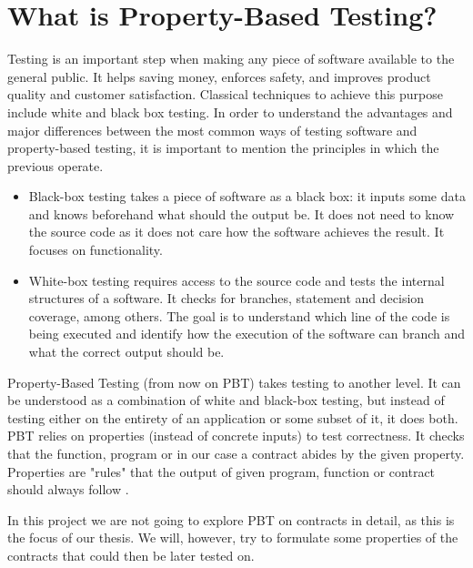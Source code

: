 \documentclass{ituthesis}
\begin{document}
\section{What is Property-Based Testing?}
Testing is an important step when making any piece of software available to the general public. It helps saving money, enforces safety, and improves product quality and customer satisfaction. %
Classical techniques to achieve this purpose include white and black box testing. %
In order to understand the advantages and major differences between the most common ways of testing software and property-based testing, it is important to mention the principles in which the previous operate.
\begin{itemize}
    \item Black-box testing takes a piece of software as a black box: it inputs some data and knows beforehand what should the output be. It does not need to know the source code as it does not care how the software achieves the result. It focuses on functionality. %
    \item White-box testing requires access to the source code and tests the internal structures of a software. It checks for branches, statement and decision coverage, among others. The goal is to understand which line of the code is being executed and identify how the execution of the software can branch and what the correct output should be. %
\end{itemize}

Property-Based Testing (from now on PBT) takes testing to another level. It can be understood as a combination of white and black-box testing, but instead of testing either on the entirety of an application or some subset of it, it does both. PBT relies on properties (instead of concrete inputs) to test correctness. It checks that the function, program or in our case a contract abides by the given property. Properties are "rules" that the output of given program, function or contract should always follow \cite{fink1994towards}.

In this project we are not going to explore PBT on contracts in detail, as this is the focus of our thesis. We will, however, try to formulate some properties of the contracts that could then be later tested on.
\end{document}
